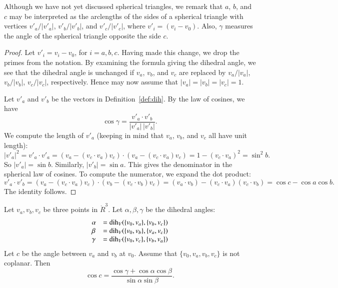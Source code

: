 \begin{remark}  Although we have not yet discussed spherical
triangles, we remark that $a$, $b$, and $c$ may be interpreted as
the arclengths of the sides of a spherical triangle with
vertices $v'_a/|v'_a|$, $v'_b/|v'_b|$, and $v'_c/|v'_c|$,
where $v'_i = (v_i-v_0)$.  Also,
$\gamma$ measures the angle of the spherical triangle opposite the
side $c$.
\end{remark}

\begin{proof}  Let $v'_i = v_i - v_0$, for $i=a,b,c$.  Having
made this change, we drop the primes from the notation.
By examining the formula giving the dihedral angle, we see that the
dihedral angle is unchanged if $v_a$, $v_b$, and $v_c$ are replaced
by $v_a/|v_a|$, $v_b/|v_b|$, $v_c/|v_c|$, respectively.  Hence
may now assume that $|v_a|=|v_b|=|v_c|=1$.

Let $v'_a$ and $v'_b$ be the vectors in Definition~\ref{def:dih}.
By the law of cosines, we have
        $$\cos\gamma = \frac{v'_a\cdot v'_b}{|v'_a|\,|v'_b|}.$$
We compute the length of $v'_a$ (keeping in mind that $v_a$, $v_b$,
and $v_c$ all have unit length):
        $$
        |v'_a|^2 = v'_a\cdot v'_a =
        (v_a - (v_c\cdot v_a)v_c)\cdot (v_a - (v_c\cdot v_a) v_c) =
        1 - (v_c\cdot v_a)^2 = \sin^2 b.
        $$
So $|v'_a| =\sin b$. Similarly, $|v'_b| = \sin a$.  This gives
the denominator in the spherical law of cosines. To compute the
numerator, we expand the dot product:
    $$
    v'_a\cdot v'_b = (v_a - (v_c\cdot v_a) v_c)\cdot (v_b - (v_c\cdot v_b) v_c)
    = (v_a\cdot v_b) - (v_c\cdot v_a) (v_c\cdot v_b) = \cos c - \cos
    a \cos b.
    $$
The identity follows.
\end{proof}

\begin{lemma}
Let $v_a,v_b,v_c$ be three points in $\ring{R}^3$.
Let $\alpha,\beta,\gamma$ be the dihedral angles: 
   $$
   \begin{array}{lll}
     \alpha &= \operatorname{dih}_V(\{v_0,v_a\},\{v_b,v_c\})\\
     \beta &= \operatorname{dih}_V(\{v_0,v_b\},\{v_a,v_c\})\\
     \gamma&= \operatorname{dih}_V(\{v_0,v_c\},\{v_b,v_a\})\\
     \end{array}
   $$
Let $c$ be the
angle between $v_a$ and $v_b$ at $v_0$. 
Assume that $\{v_0,v_a,v_b,v_c\}$ is not coplanar.
Then
    $$
    \cos c = \frac{\cos \gamma + \cos \alpha \cos \beta}
     {\sin \alpha\sin \beta}.
    $$
\end{lemma}

